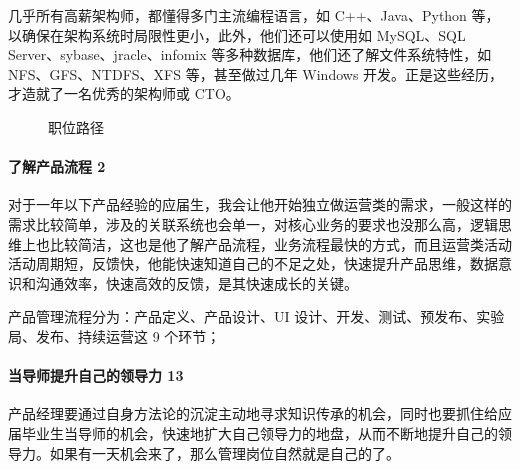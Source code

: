 \documentclass[letterpaper,10pt,english]{sphinxmanual}
\begin{document}
几乎所有高薪架构师，都懂得多门主流编程语言，如 C++、Java、Python
等，以确保在架构系统时局限性更小，此外，他们还可以使用如 MySQL、SQL
Server、sybase、jracle、infomix 等多种数据库，他们还了解文件系统特性，如
NFS、GFS、NTDFS、XFS 等，甚至做过几年 Windows
开发。正是这些经历，才造就了一名优秀的架构师或 CTO。

\begin{center}\end{center} 

\begin{figure}[H]
\centering
\capstart

\noindent{}
\caption{职位路径}\label{\detokenize{chapter_introduction/career_path:id32}}\end{figure}


\paragraph{了解产品流程 2\sphinxfootnotemark[362]}
\label{\detokenize{chapter_introduction/career_path:id18}}%
\begin{footnotetext}[362]\sphinxAtStartFootnote
{}
%
\end{footnotetext}\ignorespaces 
对于一年以下产品经验的应届生，我会让他开始独立做运营类的需求，一般这样的需求比较简单，涉及的关联系统也会单一，对核心业务的要求也没那么高，逻辑思维上也比较简洁，这也是他了解产品流程，业务流程最快的方式，而且运营类活动活动周期短，反馈快，他能快速知道自己的不足之处，快速提升产品思维，数据意识和沟通效率，快速高效的反馈，是其快速成长的关键。

产品管理流程分为：产品定义、产品设计、UI
设计、开发、测试、预发布、实验局、发布、持续运营这 9 个环节；
%
\begin{footnote}[363]\sphinxAtStartFootnote
{}
%
\end{footnote}


\paragraph{当导师提升自己的领导力 13\sphinxfootnotemark[364]}
\label{\detokenize{chapter_introduction/career_path:id19}}%
\begin{footnotetext}[364]\sphinxAtStartFootnote
{}
%
\end{footnotetext}\ignorespaces 
产品经理要通过自身方法论的沉淀主动地寻求知识传承的机会，同时也要抓住给应届毕业生当导师的机会，快速地扩大自己领导力的地盘，从而不断地提升自己的领导力。如果有一天机会来了，那么管理岗位自然就是自己的了。
\end{document}
